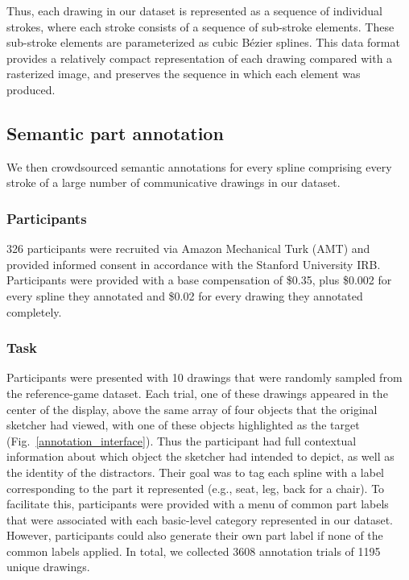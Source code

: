 \documentclass[10pt,letterpaper]{article}
\newcommand{\kushin}[1]{{\color{orange}{[kushin: #1]}}}
\begin{document}
Thus, each drawing in our dataset is represented as a sequence of individual strokes, where each stroke consists of a sequence of sub-stroke elements.
These sub-stroke elements are parameterized as cubic Bézier splines.
This data format provides a relatively compact representation of each drawing compared with a rasterized image, and preserves the sequence in which each element was produced. 

\subsection{Semantic part annotation}

We then crowdsourced semantic annotations for every spline comprising every stroke of a large number of communicative drawings in our dataset. 

\subsubsection{Participants}
326 participants were recruited via Amazon Mechanical Turk (AMT) and provided informed consent in accordance with the Stanford University IRB. 
Participants were provided with a base compensation of \$0.35, plus \$0.002 for every spline they annotated and \$0.02 for every drawing they annotated completely. 


\subsubsection{Task}
Participants were presented with 10 drawings that were randomly sampled from the reference-game dataset. 
Each trial, one of these drawings appeared in the center of the display, above the same array of four objects that the original sketcher had viewed, with one of these objects highlighted as the target (Fig.~\ref{annotation_interface}). 
Thus the participant had full contextual information about which object the sketcher had intended to depict, as well as the identity of the distractors. 
Their goal was to tag each spline with a label corresponding to the part it represented (e.g., seat, leg, back for a chair). 
To facilitate this, participants were provided with a menu of common part labels that were associated with each basic-level category represented in our dataset. 
However, participants could also generate their own part label if none of the common labels applied.
In total, we collected 3608 annotation trials of 1195 unique drawings. \kushin{Is there a better way we can say this? '3608 trials of 1195 drawings' sounds clumsy}
\end{document}
